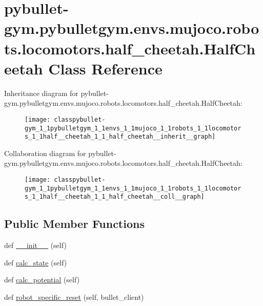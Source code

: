 \hypertarget{classpybullet-gym_1_1pybulletgym_1_1envs_1_1mujoco_1_1robots_1_1locomotors_1_1half__cheetah_1_1_half_cheetah}{}\section{pybullet-\/gym.pybulletgym.\+envs.\+mujoco.\+robots.\+locomotors.\+half\+\_\+cheetah.\+Half\+Cheetah Class Reference}
\label{classpybullet-gym_1_1pybulletgym_1_1envs_1_1mujoco_1_1robots_1_1locomotors_1_1half__cheetah_1_1_half_cheetah}


Inheritance diagram for pybullet-\/gym.pybulletgym.\+envs.\+mujoco.\+robots.\+locomotors.\+half\+\_\+cheetah.\+Half\+Cheetah\+:
\nopagebreak
\begin{figure}[H]
\begin{center}
\leavevmode
\texttt{[image: classpybullet-gym\_1\_1pybulletgym\_1\_1envs\_1\_1mujoco\_1\_1robots\_1\_1locomotors\_1\_1half\_\_cheetah\_1\_1\_half\_cheetah\_\_inherit\_\_graph]}
\end{center}
\end{figure}


Collaboration diagram for pybullet-\/gym.pybulletgym.\+envs.\+mujoco.\+robots.\+locomotors.\+half\+\_\+cheetah.\+Half\+Cheetah\+:
\nopagebreak
\begin{figure}[H]
\begin{center}
\leavevmode
\texttt{[image: classpybullet-gym\_1\_1pybulletgym\_1\_1envs\_1\_1mujoco\_1\_1robots\_1\_1locomotors\_1\_1half\_\_cheetah\_1\_1\_half\_cheetah\_\_coll\_\_graph]}
\end{center}
\end{figure}
\subsection*{Public Member Functions}
\begin{DoxyCompactItemize}
\item 
def \hyperlink{classpybullet-gym_1_1pybulletgym_1_1envs_1_1mujoco_1_1robots_1_1locomotors_1_1half__cheetah_1_1_half_cheetah_a34e8643263868e5914b1fee0c9dca5dc}{\+\_\+\+\_\+init\+\_\+\+\_\+} (self)
\item 
def \hyperlink{classpybullet-gym_1_1pybulletgym_1_1envs_1_1mujoco_1_1robots_1_1locomotors_1_1half__cheetah_1_1_half_cheetah_a06c8453148a6747ecf4ccdedf21e70fe}{calc\+\_\+state} (self)
\item 
def \hyperlink{classpybullet-gym_1_1pybulletgym_1_1envs_1_1mujoco_1_1robots_1_1locomotors_1_1half__cheetah_1_1_half_cheetah_ac5eb8ec39675aa91a4d1cec9c8e1bdd6}{calc\+\_\+potential} (self)
\item 
def \hyperlink{classpybullet-gym_1_1pybulletgym_1_1envs_1_1mujoco_1_1robots_1_1locomotors_1_1half__cheetah_1_1_half_cheetah_af74f39dcfee835e343c96fb41782a14b}{robot\+\_\+specific\+\_\+reset} (self, bullet\+\_\+client)
\end{DoxyCompactItemize}
